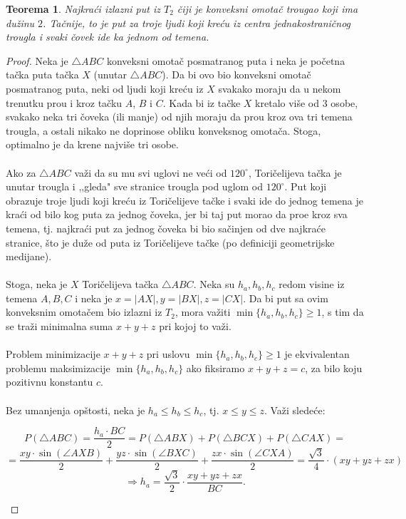 \documentclass[11pt,letter]{article}
\newtheorem{teo}{\bf Teorema}[section]
\begin{document}
\begin{teo} Najkra\' ci izlazni put iz $T_2$ \v ciji je konveksni omota\v c trougao koji ima du\v zinu $2$. Ta\v cnije, to je put za troje ljudi koji kre\' cu iz centra jednakostrani\v cnog trougla i svaki \v covek ide ka jednom od temena.
\end{teo}

\begin{proof}
Neka je $\bigtriangleup ABC$ konveksni omota\v c posmatranog puta  i neka je po\v cetna ta\v cka puta ta\v cka $X$ (unutar $\bigtriangleup ABC$). Da bi ovo bio konveksni omota\v c posmatranog puta, neki od ljudi koji kre\' cu iz $X$ svakako moraju da u nekom trenutku pro\dj u i kroz ta\v cku $A$, $B$ i $C$. Kada bi iz ta\v cke $X$ kretalo vi\v se od 3 osobe, svakako neka tri \v coveka (ili manje) od njih moraju da pro\dj u kroz ova tri temena trougla, a ostali nikako ne doprinose obliku konveksnog omota\v ca. Stoga, optimalno je da krene najvi\v se tri osobe. 
\\
\\
\indent Ako za $\bigtriangleup ABC$ va\v zi da su mu svi uglovi ne ve\' ci od $120^\circ$, Tori\v celijeva ta\v cka je unutar trougla i ,,gleda" sve stranice trougla pod uglom od $120^\circ$. Put koji obrazuje troje ljudi koji kre\' cu iz Tori\v celijeve ta\v cke i svaki ide do jednog temena je kra\' ci od bilo kog puta za jednog \v coveka, jer bi taj put morao da pro\dj e kroz sva temena, tj. najkra\' ci put za jednog \v coveka bi bio sa\v cinjen od dve najkra\' ce stranice, \v sto je du\v ze od puta iz Tori\v celijeve ta\v cke (po definiciji geometrijske medijane).
\\
\\
\indent Stoga, neka je $X$ Tori\v celijeva ta\v cka $\bigtriangleup ABC$. Neka su $h_a, h_b, h_c$ redom visine iz temena $A, B, C$ i neka je $x=|AX|, y=|BX|, z=|CX|$. Da bi put sa ovim konveksnim omota\v cem bio izlazni iz $T_2$, mora va\v ziti $\min{\{h_a,h_b,h_c\}}\geqslant 1$, s tim da se tra\v zi minimalna suma $x+y+z$ pri kojoj to va\v zi.
\\
\\
\indent Problem minimizacije $x+y+z$ pri uslovu $\min{\{h_a,h_b,h_c\}}\geqslant 1$ je ekvivalentan problemu maksimizacije $\min{\{h_a,h_b,h_c\}}$ ako fiksiramo $x+y+z=c$, za bilo koju pozitivnu konstantu $c$.
\\
\\
\indent Bez umanjenja op\v stosti, neka je $h_a\leqslant h_b\leqslant h_c$, tj. $x\leqslant y\leqslant z$. Va\v zi slede\' ce:
\begin{center}
$$P(\bigtriangleup ABC)=\frac{h_a\cdot BC}{2}=P(\bigtriangleup ABX)+P(\bigtriangleup BCX)+P(\bigtriangleup CAX)=$$
$$=\frac{xy\cdot \sin{(\angle AXB)}}{2}+\frac{yz\cdot \sin{(\angle BXC)}}{2}+\frac{zx\cdot \sin(\angle CXA)}{2}=\frac{\sqrt3}{4}\cdot(xy+yz+zx)$$
$$\Longrightarrow h_a=\frac{\sqrt3}{2}\cdot \frac{xy+yz+zx}{BC}.$$
\end{center}
\end{proof} 
\smallskip
\end{document}
